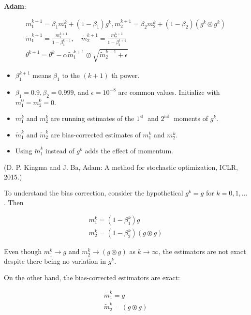 \documentclass{report}
\begin{document}
\begin{definition}
    \textbf{Adam}:

    $$
    \begin{gathered}
    m_{1}^{k+1}=\beta_{1} m_{1}^{k}+\left(1-\beta_{1}\right) g^{k}, m_{2}^{k+1}=\beta_{2} m_{2}^{k}+\left(1-\beta_{2}\right)\left(g^{k} \circledast g^{k}\right) \\
    \tilde{m}_{1}^{k+1}=\frac{m_{1}^{k+1}}{1-\beta_{1}^{k+1}}, \quad \widetilde{m}_{2}^{k+1}=\frac{m_{2}^{k+1}}{1-\beta_{2}^{k+1}} \\
    \theta^{k+1}=\theta^{k}-\alpha \widetilde{m}_{1}^{k+1} \oslash \sqrt{\widetilde{m}_{2}^{k+1}+\epsilon}
    \end{gathered}
    $$

    \begin{itemize}
        \item $\beta_{1}^{k+1}$ means $\beta_{1}$ to the $(k+1)$ th power.
        \item $\beta_{1}=0.9, \beta_{2}=0.999$, and $\epsilon=10^{-8}$ are common values. Initialize with $m_{1}^{0}=m_{2}^{0}=0$.
        \item $m_{1}^{k}$ and $m_{2}^{k}$ are running estimates of the $1^{\text {st }}$ and $2^{\text {nd }}$ moments of $g^{k}$.
        \item $\tilde{m}_{1}^{k}$ and $\tilde{m}_{2}^{k}$ are bias-corrected estimates of $m_{1}^{k}$ and $m_{2}^{k}$.
        \item Using $\widetilde{m}_{1}^{k}$ instead of $g^{k}$ adds the effect of momentum.
    \end{itemize}

    (D. P. Kingma and J. Ba, Adam: A method for stochastic optimization, ICLR, 2015.)
\end{definition}

\begin{concept}
    To understand the bias correction, consider the hypothetical $g^{k}=g$ for $k=0,1, \ldots$. Then

    $$
    \begin{gathered}
    m_{1}^{k}=\left(1-\beta_{1}^{k}\right) g \\
    m_{2}^{k}=\left(1-\beta_{2}^{k}\right)(g \circledast g)
    \end{gathered}
    $$

    Even though $m_{1}^{k} \rightarrow g$ and $m_{2}^{k} \rightarrow(g \circledast g)$ as $k \rightarrow \infty$, the estimators are not exact despite there being no variation in $g^{k}$.

    On the other hand, the bias-corrected estimators are exact:

    $$
    \begin{gathered}
    \widetilde{m}_{1}^{k}=g \\
    \widetilde{m}_{2}^{k}=(g \circledast g)
    \end{gathered}
    $$
\end{concept}
\end{document}
